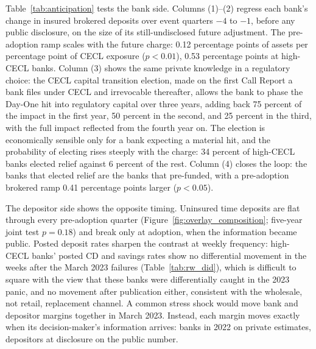 Table~\ref{tab:anticipation} tests the bank side.  Columns (1)--(2)
regress each bank's change in insured brokered deposits over event
quarters $-4$ to $-1$, before any public disclosure, on the size of
its still-undisclosed future adjustment.  The pre-adoption ramp scales
with the future charge: 0.12 percentage points of assets per percentage
point of CECL exposure ($p<0.01$), 0.53 percentage points at high-CECL
banks.  Column (3) shows the same private knowledge in a regulatory
choice: the CECL capital transition election, made on the first Call
Report a bank files under CECL and irrevocable thereafter, allows the
bank to phase the Day-One hit into regulatory capital over three
years, adding back 75 percent of the impact in the first year, 50
percent in the second, and 25 percent in the third, with the full
impact reflected from the fourth year on.  The election is
economically sensible only for a bank expecting a material hit, and
the probability of electing rises steeply with the charge: 34 percent
of high-CECL banks elected relief against 6 percent of the rest.
Column (4) closes the loop: the banks that elected relief are the
banks that pre-funded, with a pre-adoption brokered ramp 0.41
percentage points larger ($p<0.05$).

The depositor side shows the opposite timing.  Uninsured time deposits
are flat through every pre-adoption quarter
(Figure~\ref{fig:overlay_composition}; five-year joint test $p=0.18$)
and break only at adoption, when the information became public.
Posted deposit rates sharpen the contrast at weekly frequency: high-CECL
banks' posted CD and savings rates show no differential movement in the
weeks after the March 2023 failures (Table~\ref{tab:rw_did}), which is
difficult to square with the view that these banks were differentially
caught in the 2023 panic, and no movement after publication either,
consistent with the wholesale, not retail, replacement channel.  A
common stress shock would move bank and depositor margins together in
March 2023.  Instead, each margin moves exactly when its
decision-maker's information arrives: banks in 2022 on private
estimates, depositors at disclosure on the public number.
